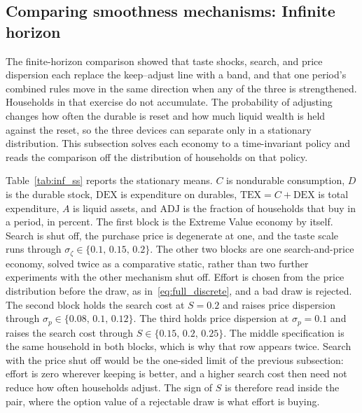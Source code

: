 \subsection{Comparing smoothness mechanisms: Infinite horizon}
\label{subsec:ModelBasicInf}

The finite-horizon comparison showed that taste shocks, search, and price dispersion each replace the keep--adjust line with a band, and that one period's combined rules move in the same direction when any of the three is strengthened. Households in that exercise do not accumulate. The probability of adjusting changes how often the durable is reset and how much liquid wealth is held against the reset, so the three devices can separate only in a stationary distribution. This subsection solves each economy to a time-invariant policy and reads the comparison off the distribution of households on that policy.

Table~\ref{tab:inf_ss} reports the stationary means. $C$ is nondurable consumption, $D$ is the durable stock, $\mathrm{DEX}$ is expenditure on durables, $\mathrm{TEX} = C + \mathrm{DEX}$ is total expenditure, $A$ is liquid assets, and $\mathrm{ADJ}$ is the fraction of households that buy in a period, in percent. The first block is the Extreme Value economy by itself. Search is shut off, the purchase price is degenerate at one, and the taste scale runs through $\sigma_\zeta \in \{0.1,\, 0.15,\, 0.2\}$. The other two blocks are one search-and-price economy, solved twice as a comparative static, rather than two further experiments with the other mechanism shut off. Effort is chosen from the price distribution before the draw, as in~\eqref{eq:full_discrete}, and a bad draw is rejected. The second block holds the search cost at $S = 0.2$ and raises price dispersion through $\sigma_p \in \{0.08,\, 0.1,\, 0.12\}$. The third holds price dispersion at $\sigma_p = 0.1$ and raises the search cost through $S \in \{0.15,\, 0.2,\, 0.25\}$. The middle specification is the same household in both blocks, which is why that row appears twice. Search with the price shut off would be the one-sided limit of the previous subsection: effort is zero wherever keeping is better, and a higher search cost then need not reduce how often households adjust. The sign of $S$ is therefore read inside the pair, where the option value of a rejectable draw is what effort is buying.

\begin{table}[htbp]
\centering
\caption{Stationary aggregates. The first block is Extreme Value taste shocks alone, with search and price dispersion shut off. The second block raises price dispersion at a fixed search cost. The third raises the search cost at a fixed price dispersion. The middle row of the second block and the middle row of the third block are the same household.}
\label{tab:inf_ss}
\footnotesize

\end{table}

